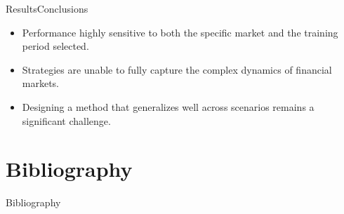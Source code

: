\documentclass[bigger]{beamer}
\begin{document}
\begin{frame}{Results}{Conclusions}
    \begin{itemize}
        \item<2-> Performance highly sensitive to both the specific market and the training period selected.
        \item<3-> Strategies are unable to fully capture the complex dynamics of financial markets.
        \item<4-> Designing a method that generalizes well across scenarios remains a significant challenge.
    \end{itemize}
\end{frame}


\section{Bibliography}

\begin{frame}{Bibliography}
    \printbibliography
\end{frame}
\end{document}
